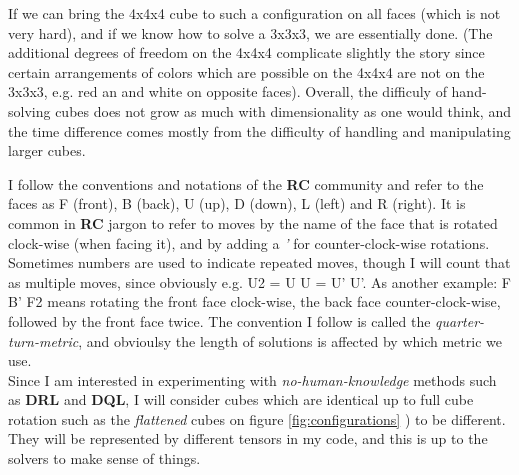 \noindent If we can bring the 4x4x4 cube to such a configuration on all faces (which is not very hard), and if we know how to solve a 3x3x3, we are essentially done. (The additional degrees of freedom on the 4x4x4 complicate slightly the story since certain arrangements of colors which are possible on the 4x4x4 are not on the 3x3x3, e.g. red an and white on opposite faces). Overall, the difficuly of hand-solving cubes does not grow as much with dimensionality as one would think, and the time difference comes mostly from the difficulty of handling and manipulating larger cubes.




I follow the conventions and notations of the \textbf{RC} community and refer to the faces as F (front), B (back), U (up), D (down), L (left) and R (right). It is common in \textbf{RC} jargon to refer to moves  by the name of the face that is rotated clock-wise (when facing it), and by adding a \textit{'} for counter-clock-wise rotations. Sometimes numbers are used to indicate repeated moves, though I will count that as multiple moves, since obviously e.g. U2 = U U = U' U'. As another example: F B' F2 means rotating the front face clock-wise, the back face counter-clock-wise, followed by the front face twice. The convention I follow is called the \textit{quarter-turn-metric}, and obvioulsy the length of solutions is affected by which metric we use.
\\
Since I am interested in experimenting with \textit{no-human-knowledge} methods such as \textbf{DRL} and \textbf{DQL}, I will consider cubes which are identical up to full cube rotation such as the \textit{flattened} cubes on figure \ref{fig:configurations} ) to be different. They will be represented by different tensors in my code, and this is up to the solvers to make sense of things.


